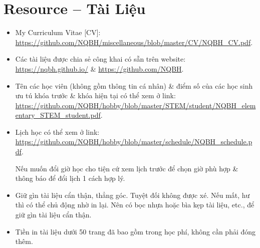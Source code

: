 \documentclass{article}
\numberwithin{equation}{section}
\begin{document}

\section{Resource -- Tài Liệu}

\begin{itemize}\itemsep0em
	\item My Curriculum Vitae [CV]: \url{https://github.com/NQBH/miscellaneous/blob/master/CV/NQBH_CV.pdf}.
	\item Các tài liệu được chia sẻ công khai có sẵn trên website: \url{https://nqbh.github.io/} \& \url{https://github.com/NQBH}.	
	\item Tên các học viên (không gồm thông tin cá nhân) \& điểm số của các học sinh ưu tú khóa trước \& khóa hiện tại có thể xem ở link: \url{https://github.com/NQBH/hobby/blob/master/STEM/student/NQBH_elementary_STEM_student.pdf}.
	\item Lịch học có thể xem ở link: \url{https://github.com/NQBH/hobby/blob/master/schedule/NQBH_schedule.pdf}.
	
	Nếu muốn đổi giờ học cho tiện cứ xem lịch trước để chọn giờ phù hợp \& thông báo để đổi lịch 1 cách hợp lý.
	\item Giữ gìn tài liệu cẩn thận, thẳng góc. Tuyệt đối không được xé. Nếu mất, hư thì có thể chủ động nhờ in lại. Nên có bọc nhựa hoặc bìa kẹp tài liệu, etc., để giữ gìn tài liệu cẩn thận.
	\item Tiền in tài liệu dưới 50 trang đã bao gồm trong học phí, không cần phải đóng thêm.
\end{itemize}


\printbibliography[heading=bibintoc]
	
\end{document}
